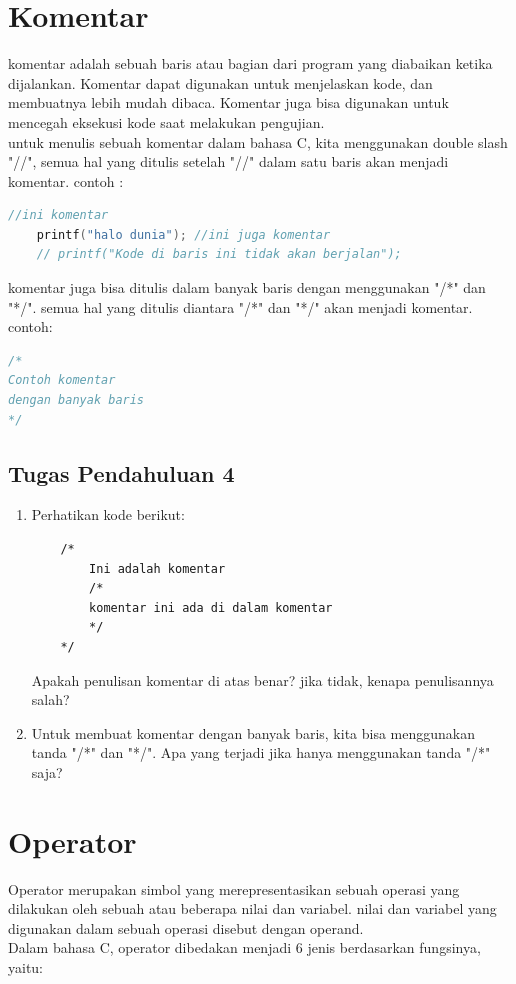 \section{Komentar}
komentar adalah sebuah baris atau bagian dari program yang diabaikan ketika dijalankan.
Komentar dapat digunakan untuk menjelaskan kode, dan membuatnya lebih mudah dibaca.
Komentar juga bisa digunakan untuk mencegah eksekusi kode saat melakukan pengujian.
\\ untuk menulis sebuah komentar dalam bahasa C, kita menggunakan double slash "//", semua hal yang ditulis setelah "//" dalam satu baris akan menjadi komentar.
contoh :
\begin{lstlisting}[language=c]
	//ini komentar
  	printf("halo dunia"); //ini juga komentar
	// printf("Kode di baris ini tidak akan berjalan");
\end{lstlisting}
komentar juga bisa ditulis dalam banyak baris dengan menggunakan "/*" dan "*/".
semua hal yang ditulis diantara "/*" dan "*/" akan menjadi komentar.
contoh:
\begin{lstlisting}[language=c]
/*
Contoh komentar
dengan banyak baris
*/
\end{lstlisting}

\subsection*{Tugas Pendahuluan 4}
\begin{enumerate}
	\item Perhatikan kode berikut:
	\begin{lstlisting}
	/*
		Ini adalah komentar
		/*
		komentar ini ada di dalam komentar
		*/
	*/
\end{lstlisting}
	Apakah penulisan komentar di atas benar? jika tidak, kenapa penulisannya salah?
	\item Untuk membuat komentar dengan banyak baris, kita bisa menggunakan tanda "/*" dan "*/".
	Apa yang terjadi jika hanya menggunakan tanda "/*" saja?
\end{enumerate}

\section{Operator}

Operator merupakan simbol yang merepresentasikan sebuah operasi yang dilakukan oleh sebuah atau beberapa nilai dan variabel.
nilai dan variabel yang digunakan dalam sebuah operasi disebut dengan operand.
\\ Dalam bahasa C, operator dibedakan menjadi 6 jenis berdasarkan fungsinya, yaitu:

